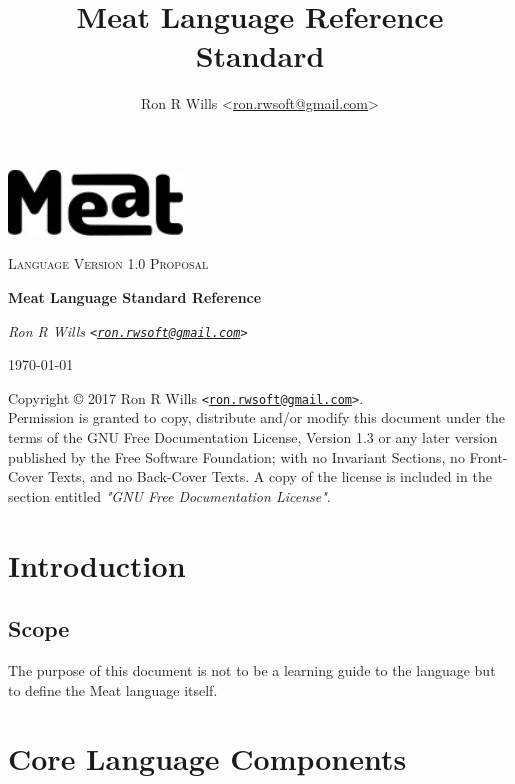 \documentclass [10pt]{article}
\title {Meat Language Reference Standard}
\author {Ron R Wills \textless\href{mailto:ron.rwsoft@gmail.com}{ron.rwsoft@gmail.com}\textgreater}
\begin{document}
\begin{titlepage}
	\centering
	\includegraphics[width=0.35\textwidth]{meat-logo.jpg}\par\vspace{2cm}
	{\scshape\Large Language Version 1.0 Proposal\par}
	\vspace{1.5cm}
	{\huge\bfseries Meat Language Standard Reference\par}
	\vspace{2cm}
	{\Large\itshape Ron R Wills \texttt{\textless\href{mailto:ron.rwsoft@gmail.com}{ron.rwsoft@gmail.com}\textgreater}}\par

	\vfill

	{\large \today\par}
\end{titlepage}

\noindent{}Copyright \copyright{} 2017 Ron R Wills \texttt{\textless\href{mailto:ron.rwsoft@gmail.com}{ron.rwsoft@gmail.com}\textgreater}.\\[.5 cm]
Permission is granted to copy, distribute and/or modify this document
under the terms of the GNU Free Documentation License, Version 1.3
or any later version published by the Free Software Foundation;
with no Invariant Sections, no Front-Cover Texts, and no Back-Cover Texts.
A copy of the license is included in the section entitled \textit{"GNU
Free Documentation License"}.
\tableofcontents
\newpage
{}

\section {Introduction}
\subsection {Scope}
The purpose of this document is not to be a learning guide to the language but
to define the Meat language itself.

\newpage
\section {Core Language Components}
\end{document}
